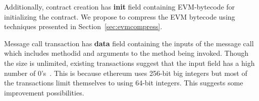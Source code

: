 Additionally, contract creation has \textbf{init} field containing EVM-bytecode for initializing the contract.
We propose to compress the EVM bytecode using techniques presented in Section~\ref{sec:evmcompress}. 

Message call transaction has \textbf{data} field containing the inputs of the message call which includes methodid and arguments to the method being invoked.
Though the size is unlimited, existing transactions suggest that the input field has a high number of 0's~\cite{ethtx}. 
This is because ethereum uses 256-bit big integers but most of the transactions limit themselves to using 64-bit integers. 
This suggests some improvement possibilities.


%

